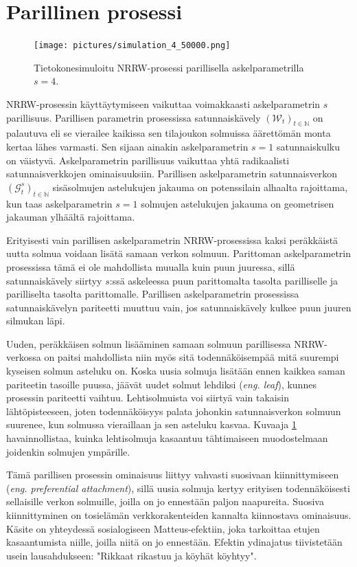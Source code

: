 \documentclass[finnish, 12pt, a4paper, sci, utf8, pdfa]{aaltothesis}
\newcommand{\N}{\mathbb{N}}
\newcommand{\Grandom}{\mathcal{G}}
\newcommand{\Wrandom}{\mathcal{W}}
\begin{document}
\section{Parillinen prosessi}

\begin{figure}[htb]
\centering
\texttt{[image: pictures/simulation\_4\_50000.png]}
   \caption{Tietokonesimuloitu NRRW-prosessi parillisella askelparametrilla $ s = 4 $. \label{figure:oma_simulaatio}}
\end{figure}

NRRW-prosessin käyttäytymiseen vaikuttaa voimakkaasti askelparametrin $ s $ parillisuus. Parillisen parametrin prosessissa satunnaiskävely $ (\Wrandom_{t})_{t \in \N} $ on palautuva eli se vierailee kaikissa sen tilajoukon solmuissa äärettömän monta kertaa lähes varmasti. Sen sijaan ainakin askelparametrin $ s = 1 $ satunnaiskulku on väistyvä. Askelparametrin parillisuus vaikuttaa yhtä radikaalisti satunnaisverkkojen ominaisuuksiin. Parillisen askelparametrin satunnaisverkon $ (\Grandom^{s}_{t})_{t \in \N} $ sisäsolmujen astelukujen jakauma on potenssilain alhaalta rajoittama, kun taas askelparametrin $ s = 1 $ solmujen astelukujen jakauma on geometrisen jakauman ylhäältä rajoittama.

Erityisesti vain parillisen askelparametrin NRRW-prosessissa kaksi peräkkäistä uutta solmua voidaan lisätä samaan verkon solmuun. Parittoman askelparametrin prosessissa tämä ei ole mahdollista muualla kuin puun juuressa, sillä satunnaiskävely siirtyy $ s $:ssä askeleessa puun parittomalta tasolta parilliselle ja parilliselta tasolta parittomalle. Parillisen askelparametrin prosessissa satunnaiskävelyn pariteetti muuttuu vain, jos satunnaiskävely kulkee puun juuren silmukan läpi.

Uuden, peräkkäisen solmun lisääminen samaan solmuun parillisessa NRRW-verkossa on paitsi mahdollista niin myös sitä todennäköisempää mitä suurempi kyseisen solmun asteluku on. Koska uusia solmuja lisätään ennen kaikkea saman pariteetin tasoille puussa, jäävät uudet solmut lehdiksi (\textit{eng. leaf}), kunnes prosessin pariteetti vaihtuu. Lehtisolmuista voi siirtyä vain takaisin lähtöpisteeseen, joten todennäköisyys palata johonkin satunnaisverkon solmuun suurenee, kun solmussa vieraillaan ja sen asteluku kasvaa. Kuvaaja \ref{figure:oma_simulaatio} havainnollistaa, kuinka lehtisolmuja kasaantuu tähtimaiseen muodostelmaan joidenkin solmujen ympärille.

Tämä parillisen prosessin ominaisuus liittyy vahvasti suosivaan kiinnittymiseen (\textit{eng. preferential attachment}), sillä uusia solmuja kertyy erityisen todennäköisesti sellaisille verkon solmuille, joilla on jo ennestään paljon naapureita. Suosiva kiinnittyminen on tosielämän verkkorakenteiden kannalta kiinnostava ominaisuus. Käsite on yhteydessä sosialogiseen Matteus-efektiin, joka tarkoittaa etujen kasaantumista niille, joilla niitä on jo ennestään. Efektin ydinajatus tiivistetään usein lausahdukseen: "Rikkaat rikastuu ja köyhät köyhtyy". 
\end{document}
